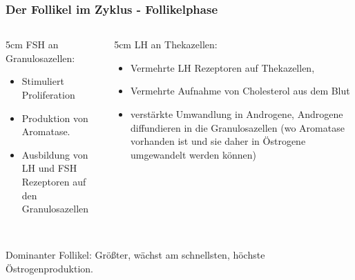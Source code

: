 \documentclass{beamer}
\begin{document}
\begin{frame}
\frametitle{ Der Follikel im Zyklus - Follikelphase}

\begin{columns}[c]
\begin{column}{5cm}
FSH an Granulosazellen:
\begin{itemize}
\item
Stimuliert Proliferation 
\item 
Produktion von Aromatase. 
\item
Ausbildung von LH und FSH Rezeptoren auf den Granulosazellen
\end{itemize}

\end{column}

\begin{column}{5cm}
LH an Thekazellen:
\begin{itemize}
\item
Vermehrte LH Rezeptoren auf Thekazellen, 
\item 
Vermehrte Aufnahme von Cholesterol aus dem Blut
\item 
verstärkte Umwandlung in Androgene, Androgene diffundieren in die Granulosazellen (wo Aromatase vorhanden ist und sie daher in Östrogene umgewandelt werden können)
\end {itemize}
\end{column}


\end{columns}

$\,$\\[0.5 cm]


Dominanter Follikel: Größter, wächst am schnellsten, höchste Östrogenproduktion.


\end{frame}



\end{document}

